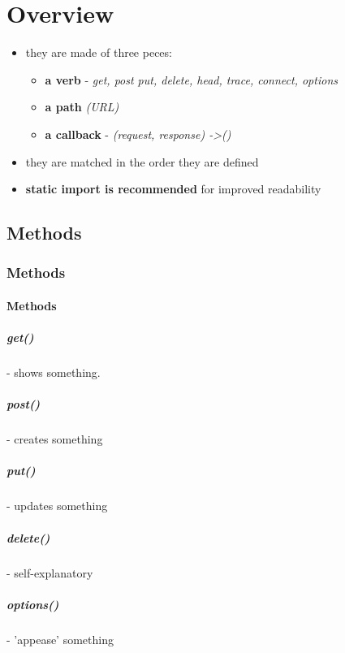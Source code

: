 \documentclass{report}
\begin{document}
\chapter{Overview}
\begin{itemize}
	\item they are made of three peces:
	\begin{itemize}
		\item \textbf{a verb} - \textit{get, post put, delete, head, trace, connect, options}
		\item \textbf{a path} \textit{(URL)}
		\item \textbf{a callback} - \textit{(request, response) -\textgreater ()}
	\end{itemize}
	\item they are matched in the order they are defined
	\item \textbf{static import is recommended} for improved readability
\end{itemize}

\section{Methods}
\subsection{Methods}
\subsubsection{Methods}

\paragraph{get()} - shows something.
\paragraph{post()} - creates something
\paragraph{put()} - updates something
\paragraph{delete()} - self-explanatory
\paragraph{options()} - 'appease' something
\end{document}
